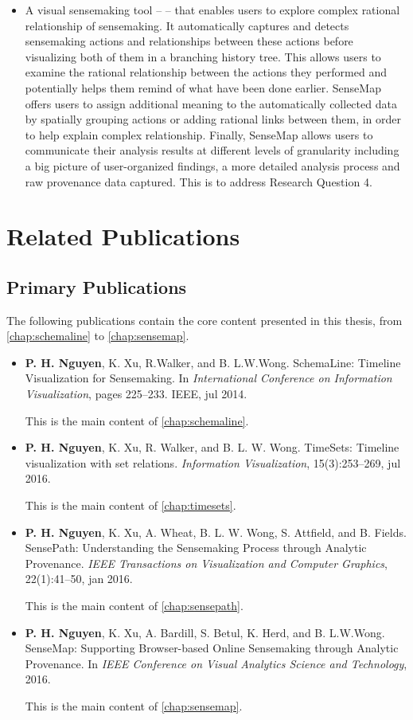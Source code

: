 \begin{itemize}
	\item A visual sensemaking tool -- \emph{} -- that enables users to explore complex rational relationship of sensemaking. It automatically captures and detects sensemaking actions and relationships between these actions before visualizing both of them in a branching history tree. This allows users to examine the rational relationship between the actions they performed and potentially helps them remind of what have been done earlier. SenseMap offers users to assign additional meaning to the automatically collected data by spatially grouping actions or adding rational links between them, in order to help explain complex relationship. Finally, SenseMap allows users to communicate their analysis results at different levels of granularity including a big picture of user-organized findings, a more detailed analysis process and raw provenance data captured. This is to address Research Question 4.
\end{itemize}

\section{Related Publications}

\subsection{Primary Publications} 
The following publications contain the core content presented in this thesis, from \autoref{chap:schemaline} to \autoref{chap:sensemap}.

\begin{itemize}
\item \textbf{P. H. Nguyen}, K. Xu, R.Walker, and B. L.W.Wong. SchemaLine: Timeline Visualization for Sensemaking. In \textit{International Conference on Information Visualization}, pages 225--233. IEEE, jul 2014.

This is the main content of \autoref{chap:schemaline}.

\item \textbf{P. H. Nguyen}, K. Xu, R. Walker, and B. L. W. Wong. TimeSets: Timeline visualization with set relations. \textit{Information Visualization}, 15(3):253--269, jul 2016. 

This is the main content of \autoref{chap:timesets}.

\item \textbf{P. H. Nguyen}, K. Xu, A. Wheat, B. L. W. Wong, S. Attfield, and B. Fields. SensePath: Understanding the Sensemaking Process through Analytic Provenance. \textit{IEEE Transactions on Visualization and Computer Graphics}, 22(1):41--50, jan 2016.

This is the main content of \autoref{chap:sensepath}.

\item \textbf{P. H. Nguyen}, K. Xu, A. Bardill, S. Betul, K. Herd, and B. L.W.Wong. SenseMap: Supporting Browser-based Online Sensemaking through Analytic Provenance. In \textit{IEEE Conference on Visual Analytics Science and Technology}, 2016.

This is the main content of \autoref{chap:sensemap}.
\end{itemize}

